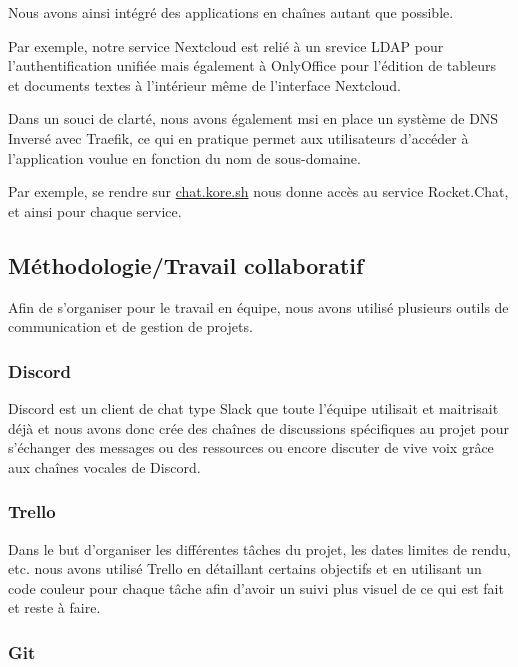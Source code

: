 Nous avons ainsi intégré des applications en chaînes autant que possible.

Par exemple, notre service Nextcloud est relié à un srevice LDAP pour l'authentification unifiée mais également à OnlyOffice pour l'édition de tableurs et documents textes à l'intérieur même de l'interface Nextcloud.

Dans un souci de clarté, nous avons également msi en place un système de DNS Inversé avec Traefik, ce qui en pratique permet aux utilisateurs d'accéder à l'application voulue en fonction du nom de sous-domaine.

Par exemple, se rendre sur \href{http://chat.kore.sh}{chat.kore.sh} nous donne accès au service Rocket.Chat, et ainsi pour chaque service.

\subsection{Méthodologie/Travail collaboratif}

Afin de s'organiser pour le travail en équipe, nous avons utilisé plusieurs outils de communication et de gestion de projets.

\subsubsection{Discord}

Discord est un client de chat type Slack que toute l'équipe utilisait et maitrisait déjà et nous avons donc crée des chaînes de discussions spécifiques au projet pour s'échanger des messages ou des ressources ou encore discuter de vive voix grâce aux chaînes vocales de Discord.

\subsubsection{Trello}

Dans le but d'organiser les différentes tâches du projet, les dates limites de rendu, etc. nous avons utilisé Trello en détaillant certains objectifs et en utilisant un code couleur pour chaque tâche afin d'avoir un suivi plus visuel de ce qui est fait et reste à faire.

\subsubsection{Git}

